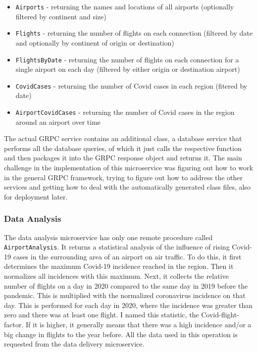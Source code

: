 \documentclass[11pt]{article}
\begin{document}
	\begin{itemize}
		\setlength\itemsep{0em}
		\item \texttt{Airports} - returning the names and locations of all airports (optionally filtered by continent and size)
		\item \texttt{Flights} - returning the number of flights on each connection (filtered by date and optionally by continent of origin or destination)
		\item \texttt{FlightsByDate} - returning the number of flights on each connection for a single airport on each day (filtered by either origin or destination airport)
		\item \texttt{CovidCases} - returning the number of Covid cases in each region (fitered by date)
		\item \texttt{AirportCovidCases} - returning the number of Covid cases in the region around an airport over time
	\end{itemize}

	The actual GRPC service contains an additional class, a database service that performs all the database queries, of which it just calls the respective function and then packages it into the GRPC response object and returns it. The main challenge in the implementation of this microservice was figuring out how to work in the general GRPC framework, trying to figure out how to address the other services and getting how to deal with the automatically generated class files, also for deployment later.
	
	\subsubsection{Data Analysis}
	
	The data analysis microservice has only one remote procedure called \texttt{AirportAnalysis}. It returns a statistical analysis of the influence of rising Covid-19 cases in the surrounding area of an airport on air traffic. To do this, it first determines the maximum Covid-19 incidence reached in the region. Then it normalizes all incidences with this maximum. Next, it collects the relative number of flights on a day in 2020 compared to the same day in 2019 before the pandemic. This is multiplied with the normalized coronavirus incidence on that day. This is performed for each day in 2020, where the incidence was greater than zero and there was at least one flight. I named this statistic, the Covid-flight-factor. If it is higher, it generally means that there was a high incidence and/or a big change in flights to the year before. All the data used in this operation is requested from the data delivery microservice.
	
\end{document}
